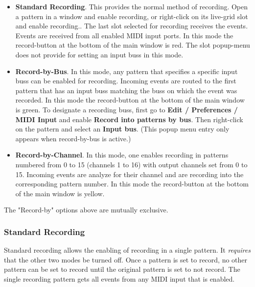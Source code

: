    \begin{itemize}
      \item \textbf{Standard Recording}.
         This provides the normal method of recording. Open a pattern in a
         window and enable recording, or right-click on its live-grid
         slot and enable recording..
         The last slot selected for recording receives the events.
         Events are received from all enabled MIDI input ports.
         In this mode the record-button at the bottom of the main window
         is red.
         The slot popup-menu does not provide for setting an input buss
         in this mode.
      \item \textbf{Record-by-Bus}.
         In this mode, any pattern that specifies a specific input buss
         can be enabled for recording.
         Incoming events are routed to the first pattern that has an input
         buss matching the buss on which the event was recorded.
         In this mode the record-button at the bottom of the main window
         is green.
         To designate a recording buss, first go to
         \textbf{Edit / Preferences / MIDI Input} and enable
         \textbf{Record into patterns by bus}.
         Then right-click on the pattern and select an
         \textbf{Input bus}. (This popup menu entry only appears when
         record-by-bus is active.)
      \item \textbf{Record-by-Channel}.
         In this mode, one enables recording in patterns numbered from 0 to 15
         (channels 1 to 16) with output channels set from 0 to 15.
         Incoming events are analyze for their channel and are recording into
         the corresponding pattern number.
         In this mode the record-button at the bottom of the main window
         is yellow.
   \end{itemize}

   The "Record-by" options above are mutually exclusive.

\subsubsection{Standard Recording}
\label{subsubsec:recording_standard_recording}

   Standard recording allows the enabling of recording in a single pattern.
   It \textsl{requires} that the other two modes be turned off.
   Once a pattern is set to record, no other pattern can be set to record until
   the original pattern is set to not record.
   The single recording pattern gets all events from any MIDI
   input that is enabled.

